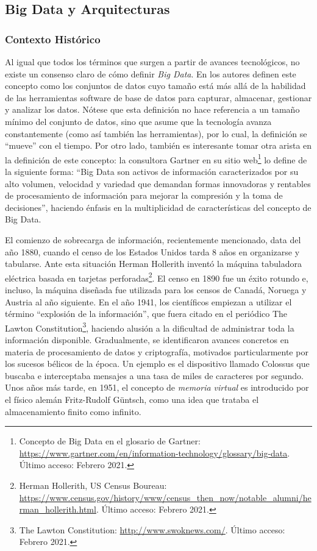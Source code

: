 \subsection{Big Data y Arquitecturas}
\subsubsection{Contexto Histórico}
Al igual que todos los términos que surgen a partir de avances tecnológicos, no existe un consenso claro de cómo definir \textit{Big Data}. En \citep{manyika2011big} los autores definen este concepto como los conjuntos de datos cuyo tamaño está más allá de la habilidad de las herramientas software de base de datos para capturar, almacenar, gestionar y analizar los datos. Nótese que esta definición no hace referencia a un tamaño mínimo del conjunto de datos, sino que asume que la tecnología avanza constantemente (como así también las herramientas), por lo cual, la definición se ``mueve'' con el tiempo. Por otro lado, también es interesante tomar otra arista en la definición de este concepto: la consultora Gartner en su sitio web\footnote{Concepto de Big Data en el glosario de Gartner: \url{https://www.gartner.com/en/information-technology/glossary/big-data}. Último acceso: Febrero 2021.} lo define de la siguiente forma: ``Big Data son activos de información caracterizados por su alto volumen, velocidad y variedad que demandan formas innovadoras y rentables de procesamiento de información para mejorar la compresión y la toma de decisiones'', haciendo énfasis en la multiplicidad de características del concepto de Big Data.

\bigskip El comienzo de sobrecarga de información, recientemente mencionado, data del año 1880, cuando el censo de los Estados Unidos tarda 8 años en organizarse y tabularse. Ante esta situación Herman Hollerith inventó la máquina tabuladora eléctrica basada en tarjetas perforadas\footnote{Herman Hollerith, US Census Boureau: \url{https://www.census.gov/history/www/census_then_now/notable_alumni/herman_hollerith.html}. Último acceso: Febrero 2021.}. El censo en 1890 fue un éxito rotundo e, incluso, la máquina diseñada fue utilizada para los censos de Canadá, Noruega y Austria al año siguiente. En el año 1941, los científicos empiezan a utilizar el término “explosión de la información”, que fuera citado en el periódico The Lawton Constitution\footnote{The Lawton Constitution: \url{http://www.swoknews.com/}. Último acceso: Febrero 2021.}, haciendo alusión a la dificultad de administrar toda la información disponible. Gradualmente, se identificaron avances concretos en materia de procesamiento de datos y criptografía, motivados particularmente por los sucesos bélicos de la época. Un ejemplo es el dispositivo llamado Colossus \citep{copeland2004colossus} que buscaba e interceptaba mensajes a una tasa de miles de caracteres por segundo. Unos años más tarde, en 1951, el concepto de \textit{memoria virtual} es introducido por el físico alemán Fritz-Rudolf Güntsch, como una idea que trataba el almacenamiento finito como infinito.

